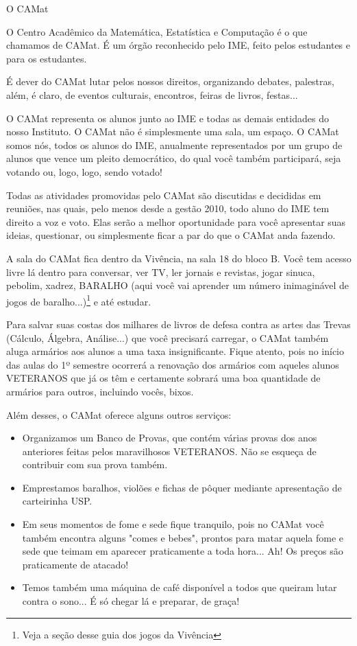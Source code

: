 \begin{secao}{O CAMat}

O Centro Acadêmico da Matemática, Estatística e Computação é o que chamamos de
CAMat. É um órgão reconhecido pelo IME, feito pelos estudantes e para os
estudantes.

É dever do CAMat lutar pelos nossos direitos, organizando debates, palestras,
além, é claro, de eventos culturais, encontros, feiras de livros, festas...

O CAMat representa os alunos junto ao IME e todas as demais entidades do nosso
Instituto. O CAMat não é simplesmente uma sala, um espaço. O CAMat somos nós,
todos os alunos do IME, anualmente representados por um grupo de alunos que
vence um pleito democrático, do qual você também participará, seja votando ou,
logo, logo, sendo votado!

Todas as atividades promovidas pelo CAMat são discutidas e decididas em
reuniões, nas quais, pelo menos desde a gestão 2010, todo aluno do IME tem
direito a voz e voto. Elas serão a melhor oportunidade para você apresentar suas
ideias, questionar, ou simplesmente ficar a par do que o CAMat
anda fazendo.

A sala do CAMat  fica dentro da Vivência, na sala 18 do bloco B. Você tem acesso
livre lá dentro para conversar, ver TV, ler jornais e revistas, jogar sinuca,
pebolim, xadrez, BARALHO (aqui você vai aprender um número inimaginável de
jogos de baralho...)\footnote{Veja a seção desse guia dos jogos da
Vivência} e até estudar.

Para salvar suas costas dos milhares de livros de defesa contra as artes das
Trevas (Cálculo, Álgebra, Análise...) que você precisará carregar, o CAMat
também aluga armários aos alunos a uma taxa insignificante. Fique atento, pois no
início das aulas do 1º semestre ocorrerá a renovação dos armários com
aqueles alunos VETERANOS que já os têm e certamente sobrará uma boa quantidade
de armários para outros, incluindo vocês, bixos.

Além desses, o CAMat oferece alguns outros serviços:

\begin{itemize}
\item Organizamos um Banco de Provas, que contém várias provas dos anos anteriores feitas
pelos maravilhosos VETERANOS. Não se esqueça de contribuir com sua prova também.
\item Emprestamos baralhos, violões e fichas de pôquer mediante apresentação de
carteirinha USP.
\item Em seus momentos de fome e sede fique tranquilo, pois no CAMat você
também encontra alguns "comes e bebes", prontos para matar aquela fome e sede
que teimam em aparecer praticamente a toda hora... Ah! Os preços são praticamente
de atacado!
\item Temos também uma máquina de café disponível a todos que queiram lutar
contra o sono... É só chegar lá e preparar, de graça!
\end{itemize}


\end{secao}

